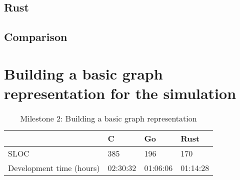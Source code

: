 \subsection{Rust}
\label{subsec:Implementation::Counting::Rust}


\subsection{Comparison}
\label{subsec:Implementation::Counting::Comparison}

\section{Building a basic graph representation for the simulation}
\label{sec:Implementation::Graph_Representation}

\begin{table}[htb]
    \centering
    \begin{tabular}{llll}
        \toprule
            & C
            & Go
            & Rust \\
        \midrule

        SLOC
            & 385
            & 196
            & 170 \\

        Development time (hours)
            & 02:30:32
            & 01:06:06
            & 01:14:28 \\
        \bottomrule
    \end{tabular}
    \caption{Milestone 2: Building a basic graph representation}
    \label{tb:milestone2}
\end{table}

